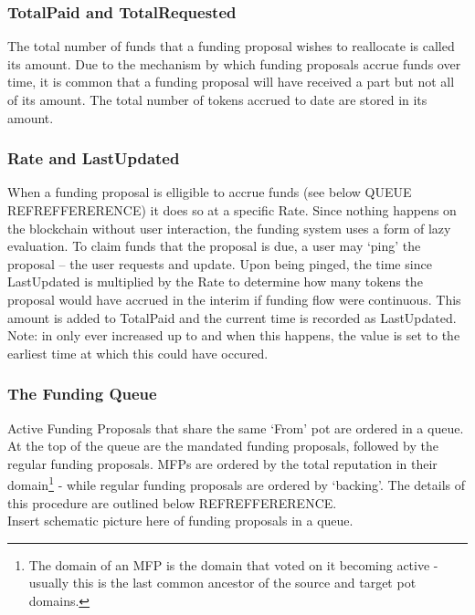 \subsubsection*{TotalPaid and TotalRequested}
The total number of funds that a funding proposal wishes to reallocate is called its  amount. Due to the mechanism by which funding proposals accrue funds over time, it is common that a funding proposal will have received a part but not all of its  amount. The total number of tokens accrued to date are stored in its  amount. 

\subsubsection*{Rate and LastUpdated}
When a funding proposal is elligible to accrue funds (see below QUEUE REFREFFERERENCE) it does so at a specific Rate. Since nothing happens on the blockchain without user interaction, the funding system uses a form of lazy evaluation. To claim funds that the proposal is due, a user may `ping' the proposal -- the user requests and update. Upon being pinged, the time since LastUpdated is multiplied by the Rate to determine how many tokens the proposal would have accrued in the interim if funding flow were continuous. This amount is added to TotalPaid and the current time is recorded as LastUpdated.\\
Note:  in only ever increased up to  and when this happens, the  value is set to the earliest time at which this could have occured.

\subsubsection{The Funding Queue}
Active Funding Proposals that share the same `From' pot are ordered in a queue. At the top of the queue are the mandated funding proposals, followed by the regular funding proposals. MFPs are ordered by the total reputation in their domain\footnote{The domain of an MFP is the domain that voted on it becoming active - usually this is the last common ancestor of the source and target pot domains.} - while regular funding proposals are ordered by `backing'.  The details of this procedure are outlined below REFREFFERERENCE.\\



Insert schematic picture here of funding proposals in a queue.\\[2cm]









